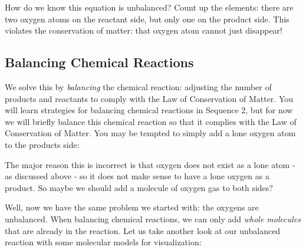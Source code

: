 \begin{center}
\end{center}

How do we know this equation is unbalanced? Count up the elements: there are two 
oxygen atoms on the reactant side, but only one on the product side. This violates 
the conservation of matter: that oxygen atom cannot just disappear!

\subsection{Balancing Chemical Reactions}
We solve this by \textit{balancing} the chemical reaction: adjusting the number 
of products and reactants to comply with the Law of Conservation of Matter. You will
learn strategies for balancing chemical reactions in Sequence 2, but for now we will
briefly balance this chemical reaction so that it complies with the Law of 
Conservation of Matter. You may be tempted to simply add a lone oxygen atom to 
the products side:

\begin{center}
\end{center}

The major reason this is incorrect is that oxygen does not exist as a lone atom -
as discussed above - so it does not make sense to have a lone oxygen as a product. 
So maybe we should add a molecule of oxygen gas to both sides?

\begin{center}
\end{center}

Well, now we have the same problem we started with: the oxygens are unbalanced. 
When balancing chemical reactions, we can only add \textit{whole molecules} that 
are already in the reaction. Let us take another look at our unbalanced reaction 
with some molecular models for visualization:

